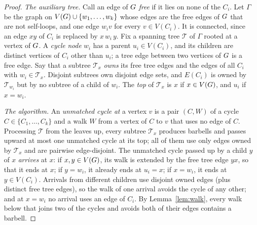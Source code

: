 \documentclass[11pt,a4paper]{article}
\theoremstyle{definition}
\theoremstyle{remark}
\theoremstyle{plain}
\theoremstyle{definition}
\begin{document}
\begin{proof}
\emph{The auxiliary tree.} Call an edge of \(G\) \emph{free} if it lies on
none of the \(C_i\). Let \(\Gamma\) be the graph on
\(V(G)\cup\{w_1,\dots,w_k\}\) whose edges are the free edges of \(G\) that
are not self-loops, and one edge \(w_iv\) for every \(v\in V(C_i)\). It is
connected, since an edge \(xy\) of \(C_i\) is replaced by \(x\,w_i\,y\). Fix
a spanning tree \(\mathcal T\) of \(\Gamma\) rooted at a vertex of \(G\). A
\emph{cycle node} \(w_i\) has a parent \(u_i\in V(C_i)\), and its children
are distinct vertices of \(C_i\) other than \(u_i\); a tree edge between two
vertices of \(G\) is a free edge. Say that a subtree \(\mathcal T_x\)
\emph{owns} its free tree edges and the edges of all \(C_i\) with
\(w_i\in\mathcal T_x\). Disjoint subtrees own disjoint edge sets, and
\(E(C_i)\) is owned by \(\mathcal T_{w_i}\) but by no subtree of a child of
\(w_i\). The \emph{top} of \(\mathcal T_x\) is \(x\) if \(x\in V(G)\), and
\(u_i\) if \(x=w_i\).

\emph{The algorithm.} An \emph{unmatched cycle at} a vertex \(v\) is a pair
\((C,W)\) of a cycle \(C\in\{C_1,\dots,C_k\}\) and a walk \(W\) from a vertex
of \(C\) to \(v\) that uses no edge of \(C\). Processing \(\mathcal T\) from
the leaves up, every subtree \(\mathcal T_x\) produces barbells and passes
upward at most one unmatched cycle at its top; all of them use only edges
owned by \(\mathcal T_x\) and are pairwise edge-disjoint. The unmatched cycle
passed up by a child \(y\) of \(x\) \emph{arrives} at \(x\): if \(x,y\in
V(G)\), its walk is extended by the free tree edge \(yx\), so that it ends at
\(x\); if \(y=w_i\), it already ends at \(u_i=x\); if \(x=w_i\), it ends at
\(y\in V(C_i)\). Arrivals from different children use disjoint owned edges
(plus distinct free tree edges), so the walk of one arrival avoids the cycle
of any other; and at \(x=w_i\) no arrival uses an edge of \(C_i\). By
Lemma~\ref{lem:walk}, every walk below that joins two of the cycles and
avoids both of their edges contains a barbell.


\end{proof}
\end{document}
